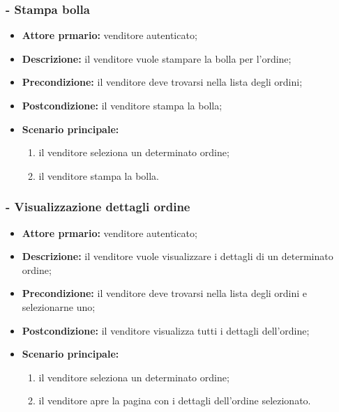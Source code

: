 \stepsubUserCase
\subsubsection{- Stampa bolla}
\begin{itemize}
    \item \textbf{Attore prmario:} venditore autenticato;
    \item \textbf{Descrizione:} il venditore vuole stampare la bolla per l'ordine;
    \item \textbf{Precondizione:} il venditore deve trovarsi nella lista degli ordini;
    \item \textbf{Postcondizione:} il venditore stampa la bolla;
    \item \textbf{Scenario principale:}
          \begin{enumerate}
              \item il venditore seleziona un determinato ordine;
              \item il venditore stampa la bolla.
          \end{enumerate}
\end{itemize}

\stepsubUserCase
\subsubsection{- Visualizzazione dettagli ordine}
\begin{itemize}
    \item \textbf{Attore prmario:} venditore autenticato;
    \item \textbf{Descrizione:} il venditore vuole visualizzare i dettagli di un determinato ordine;
    \item \textbf{Precondizione:} il venditore deve trovarsi nella lista degli ordini e selezionarne uno;
    \item \textbf{Postcondizione:} il venditore visualizza tutti i dettagli dell'ordine;
    \item \textbf{Scenario principale:}
          \begin{enumerate}
              \item il venditore seleziona un determinato ordine;
              \item il venditore apre la pagina con i dettagli dell'ordine selezionato.
          \end{enumerate}
\end{itemize}

